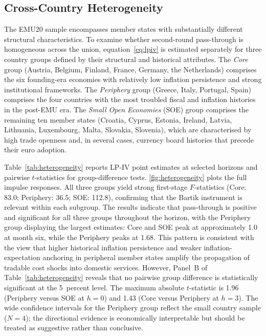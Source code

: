 \documentclass[a4paper,12pt]{article}
\begin{document}
\subsection{Cross-Country Heterogeneity}\label{sec:heterogeneity}

The EMU20 sample encompasses member states with substantially different structural characteristics. To examine whether second-round pass-through is homogeneous across the union, equation~\eqref{eq:lpiv} is estimated separately for three country groups defined by their structural and historical attributes. The \textit{Core} group (Austria, Belgium, Finland, France, Germany, the Netherlands) comprises the six founding-era economies with relatively low inflation persistence and strong institutional frameworks. The \textit{Periphery} group (Greece, Italy, Portugal, Spain) comprises the four countries with the most troubled fiscal and inflation histories in the post-EMU era. The \textit{Small Open Economies} (SOE) group comprises the remaining ten member states (Croatia, Cyprus, Estonia, Ireland, Latvia, Lithuania, Luxembourg, Malta, Slovakia, Slovenia), which are characterised by high trade openness and, in several cases, currency board histories that precede their euro adoption.

Table~\ref{tab:heterogeneity} reports LP-IV point estimates at selected horizons and pairwise $t$-statistics for group-difference tests. \autoref{fig:heterogeneity} plots the full impulse responses. All three groups yield strong first-stage $F$-statistics (Core: 83.0; Periphery: 36.5; SOE: 112.8), confirming that the Bartik instrument is relevant within each subgroup. The results indicate that pass-through is positive and significant for all three groups throughout the horizon, with the Periphery group displaying the largest estimates: Core and SOE peak at approximately 1.0 at month six, while the Periphery peaks at 1.68. This pattern is consistent with the view that higher historical inflation persistence and weaker inflation-expectation anchoring in peripheral member states amplify the propagation of tradable cost shocks into domestic services. However, Panel~B of Table~\ref{tab:heterogeneity} reveals that no pairwise group difference is statistically significant at the 5~percent level. The maximum absolute $t$-statistic is 1.96 (Periphery versus SOE at $h=0$) and 1.43 (Core versus Periphery at $h=3$). The wide confidence intervals for the Periphery group reflect the small country sample ($N=4$); the directional evidence is economically interpretable but should be treated as suggestive rather than conclusive.
\end{document}
